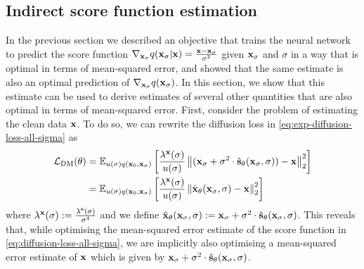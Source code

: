 \subsection{Indirect score function estimation} \label{eq:diffusion-equivalent-parameterisations}
In the previous section we described an objective that trains the neural network to predict the score function $\nabla_{{\mathbf{x}}_\sigma} q({\mathbf{x}}_\sigma|{\mathbf{x}}) = \frac{{\mathbf{x}}-{\mathbf{x}}_\sigma}{\sigma^2}$ given ${\mathbf{x}}_\sigma$ and $\sigma$ in a way that is optimal in terms of mean-squared error, and showed that the same estimate is also an optimal prediction of $\nabla_{{\mathbf{x}}_\sigma} q({\mathbf{x}}_\sigma)$. In this section, we show that this estimate can be used to derive estimates of several other quantities that are also optimal in terms of mean-squared error. First, consider the problem of estimating the clean data ${\mathbf{x}}$. To do so, we can rewrite the diffusion loss in \cref{eq:exp-diffusion-loss-all-sigma} as
\begin{align} \label{eq:x0-diffusion-loss}
    \mathcal{L}_\text{DM}(\theta) &= \mathbb{E}_{u(\sigma)q({\mathbf{x}}_0, {\mathbf{x}}_\sigma)} \left[ \frac{\lambda^{\mathbf{x}}(\sigma)}{u(\sigma)}
    \left\| ({\mathbf{x}}_\sigma + \sigma^2 \cdot \hat{{\mathbf{s}}}_\theta({\mathbf{x}}_\sigma, \sigma)) - {\mathbf{x}} \right\|_2^2 \right] \\
    &= \mathbb{E}_{u(\sigma)q({\mathbf{x}}_0, {\mathbf{x}}_\sigma)} \left[ 
    \frac{\lambda^{\mathbf{x}}(\sigma)}{u(\sigma)}
    \left\| \hat{{\mathbf{x}}}_\theta({\mathbf{x}}_\sigma, \sigma) - {\mathbf{x}} \right\|_2^2 \right]
\end{align}
where $\lambda^{\mathbf{x}}(\sigma) := \frac{\lambda^{\mathbf{s}}(\sigma)}{\sigma^4}$ and we define $\hat{{\mathbf{x}}}_\theta({\mathbf{x}}_\sigma, \sigma) := {\mathbf{x}}_\sigma + \sigma^2 \cdot \hat{{\mathbf{s}}}_\theta({\mathbf{x}}_\sigma, \sigma)$. This reveals that, while optimising the mean-squared error estimate of the score function in \cref{eq:diffusion-loss-all-sigma}, we are implicitly also optimising a mean-squared error estimate of ${\mathbf{x}}$ which is given by ${\mathbf{x}}_\sigma + \sigma^2 \cdot \hat{{\mathbf{s}}}_\theta({\mathbf{x}}_\sigma, \sigma)$.

